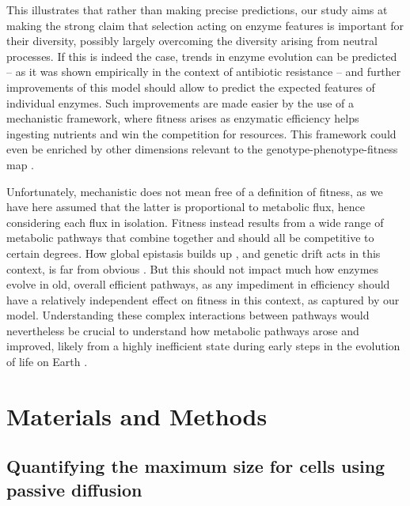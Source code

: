 \documentclass[11pt,onecolumn]{article}
\begin{document}
This illustrates that rather than making precise predictions, our study aims at making the strong claim that selection acting on enzyme features is important for their diversity, possibly largely overcoming the diversity arising from neutral processes. If this is indeed the case, trends in enzyme evolution can be predicted -- as it was shown empirically in the context of antibiotic resistance \citep{Walkiewicz12} -- and further improvements of this model should allow to predict the expected features of individual enzymes. Such improvements are made easier by the use of a mechanistic framework, where fitness arises as enzymatic efficiency helps ingesting nutrients and win the competition for resources. This framework could even be enriched by other dimensions relevant to the genotype-phenotype-fitness map \citep{Bershtein17,Echave19,Kinsler20}. 

Unfortunately, mechanistic does not mean free of a definition of fitness, as we have here assumed that the latter is proportional to metabolic flux, hence considering each flux in isolation. Fitness instead results from a wide range of metabolic pathways that combine together and should all be competitive to certain degrees. How global epistasis builds up \citep{Weinreich13,Otwinowski18,Reddy20}, and genetic drift acts in this context, is far from obvious \citep{Iwasa04,Weinreich05,Weissman09}. But this should not impact much how enzymes evolve in old, overall efficient pathways, as any impediment in efficiency should have a relatively independent effect on fitness in this context, as captured by our model. Understanding these complex interactions between pathways would nevertheless be crucial to understand how metabolic pathways arose and improved, likely from a highly inefficient state during early steps in the evolution of life on Earth \citep{Kacser84,Schmidt03,Heckmann18}.

\section{Materials and Methods\label{sec:M&M}}

\subsection{Quantifying the maximum size for cells using passive diffusion}
\end{document}
